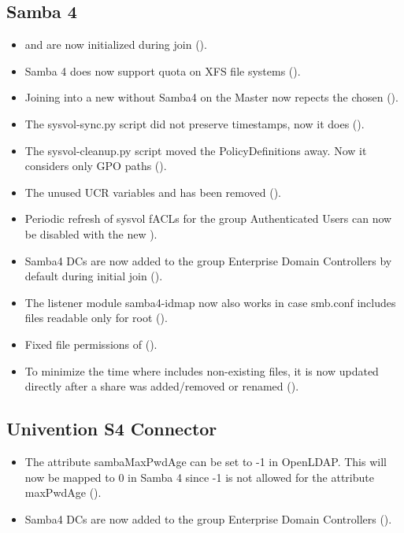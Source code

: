 \subsection{Samba 4}
\begin{itemize}
\item {} and  are now initialized during join ().
\item Samba 4 does now support quota on XFS file systems ().
\item Joining into a new  without Samba4 on the Master now repects the chosen  ().
\item The sysvol-sync.py script did not preserve timestamps, now it does ().
\item The sysvol-cleanup.py script moved the PolicyDefinitions away. Now it considers only GPO paths ().
\item The unused UCR variables  and  has been removed ().
\item Periodic refresh of sysvol fACLs for the group Authenticated Users can
now be disabled with the new  ).
\item Samba4 DCs are now added to the group Enterprise Domain Controllers
by default during initial join ().
\item The listener module samba4-idmap now also works in case smb.conf includes files readable
only for root ().
\item Fixed file permissions of  ().
\item To minimize the time where  includes non-existing files, it is now updated directly after a share was added/removed or renamed ().
\end{itemize}

\subsection{Univention S4 Connector}
\begin{itemize}
\item The attribute sambaMaxPwdAge can be set to -1 in OpenLDAP. This will
  now be mapped to 0 in Samba 4 since -1 is not allowed for the attribute
  maxPwdAge ().
\item Samba4 DCs are now added to the group Enterprise Domain Controllers ().
\end{itemize}

